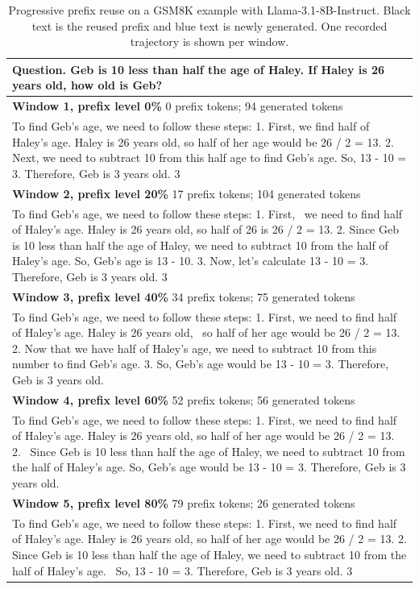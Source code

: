 \begin{table}[t]
\centering\small
\caption{Progressive prefix reuse on a GSM8K example with Llama-3.1-8B-Instruct. Black text is the reused prefix and blue text is newly generated. One recorded trajectory is shown per window.}
\label{tab:prefix_case}
\begin{tabularx}{\linewidth}{@{}X@{}}
\toprule
\textbf{Question.} Geb is 10 less than half the age of Haley. If Haley is 26 years old, how old is Geb? \\
\midrule
\textbf{Window 1, prefix level 0\%} \hfill 0 prefix tokens; 94 generated tokens \\
{\color{blue}To find Geb's age, we need to follow these steps:  1. First, we find half of Haley's age. Haley is 26 years old, so half of her age would be 26 / 2 = 13.  2. Next, we need to subtract 10 from this half age to find Geb's age. So, 13 - 10 = 3.  Therefore, Geb is 3 years old.  $\boxed{3}$} \\
\midrule
\textbf{Window 2, prefix level 20\%} \hfill 17 prefix tokens; 104 generated tokens \\
To find Geb's age, we need to follow these steps:  1. First,\ {\color{blue} we need to find half of Haley's age. Haley is 26 years old, so half of 26 is 26 / 2 = 13.  2. Since Geb is 10 less than half the age of Haley, we need to subtract 10 from the half of Haley's age. So, Geb's age is 13 - 10.  3. Now, let's calculate 13 - 10 = 3.  Therefore, Geb is 3 years old.  $\boxed{3}$} \\
\midrule
\textbf{Window 3, prefix level 40\%} \hfill 34 prefix tokens; 75 generated tokens \\
To find Geb's age, we need to follow these steps:  1. First, we need to find half of Haley's age. Haley is 26 years old,\ {\color{blue} so half of her age would be 26 / 2 = 13.  2. Now that we have half of Haley's age, we need to subtract 10 from this number to find Geb's age.   3. So, Geb's age would be 13 - 10 = 3.  Therefore, Geb is $\boxed{3}$ years old.} \\
\midrule
\textbf{Window 4, prefix level 60\%} \hfill 52 prefix tokens; 56 generated tokens \\
To find Geb's age, we need to follow these steps:  1. First, we need to find half of Haley's age. Haley is 26 years old, so half of her age would be 26 / 2 = 13.  2.\ {\color{blue} Since Geb is 10 less than half the age of Haley, we need to subtract 10 from the half of Haley's age. So, Geb's age would be 13 - 10 = 3.  Therefore, Geb is $\boxed{3}$ years old.} \\
\midrule
\textbf{Window 5, prefix level 80\%} \hfill 79 prefix tokens; 26 generated tokens \\
To find Geb's age, we need to follow these steps:  1. First, we need to find half of Haley's age. Haley is 26 years old, so half of her age would be 26 / 2 = 13.  2. Since Geb is 10 less than half the age of Haley, we need to subtract 10 from the half of Haley's age.\ {\color{blue} So, 13 - 10 = 3.  Therefore, Geb is 3 years old.  $\boxed{3}$} \\
\bottomrule
\end{tabularx}
\end{table}
